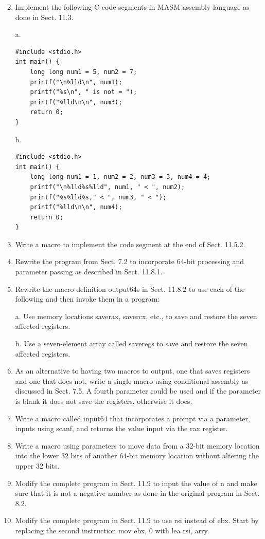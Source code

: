 \documentclass[10pt]{book}
\begin{document}
\begin{enumerate}
  \setcounter{enumi}{1}
  \item Implement the following C code segments in MASM assembly language as done in Sect. 11.3.

a.
\begin{verbatim}
#include <stdio.h>
int main() {
    long long num1 = 5, num2 = 7;
    printf("\n%lld\n", num1);
    printf("%s\n", " is not = ");
    printf("%lld\n\n", num3);
    return 0;
}
\end{verbatim}

b.
\begin{verbatim}
#include <stdio.h>
int main() {
    long long num1 = 1, num2 = 2, num3 = 3, num4 = 4;
    printf("\n%lld%s%lld", num1, " < ", num2);
    printf("%s%lld%s," < ", num3, " < ");
    printf("%lld\n\n", num4);
    return 0;
}
\end{verbatim}

  \item Write a macro to implement the code segment at the end of Sect. 11.5.2.
  \item Rewrite the program from Sect. 7.2 to incorporate 64-bit processing and parameter passing as described in Sect. 11.8.1.
  \item Rewrite the macro definition output64s in Sect. 11.8.2 to use each of the following and then invoke them in a program:
  
a. Use memory locations saverax, savercx, etc., to save and restore the seven affected registers.

b. Use a seven-element array called saveregs to save and restore the seven affected registers.
  \item As an alternative to having two macros to output, one that saves registers and one that does not, write a single macro using conditional assembly as discussed in Sect. 7.5. A fourth parameter could be used and if the parameter is blank it does not save the registers, otherwise it does.
  \item Write a macro called input64 that incorporates a prompt via a parameter, inputs using scanf, and returns the value input via the rax register.
  \item Write a macro using parameters to move data from a 32-bit memory location into the lower 32 bits of another 64-bit memory location without altering the upper 32 bits.
  \item Modify the complete program in Sect. 11.9 to input the value of n and make sure that it is not a negative number as done in the original program in Sect. 8.2.
  \item Modify the complete program in Sect. 11.9 to use rsi instead of ebx. Start by replacing the second instruction mov ebx, 0 with lea rsi, arry.
\end{enumerate}
\end{document}
